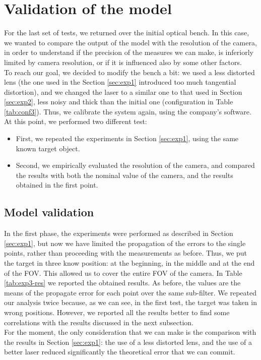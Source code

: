 \section{Validation of the model}
For the last set of tests, we returned over the initial optical bench. In this case, we wanted to compare the output of the model with the resolution of the camera, in order to understand if the precision of the measures we can make, is inferiorly limited by camera resolution, or if it is influenced also by some other factors. \\
To reach our goal, we decided to modify the bench a bit: we used a less distorted lens (the one used in the Section \ref{sec:exp1} introduced too much tangential distortion), and we changed the laser to a similar one to that used in Section \ref{sec:exp2}, less noisy and thick than the initial one (configuration in Table \ref{tab:conf3}). Thus, we calibrate the system again, using the company's software. At this point, we performed two different test:
 \begin{itemize}
   \item First, we repeated the experiments in Section \ref{sec:exp1}, using the same known target object.
   \item Second, we empirically evaluated the resolution of the camera, and compared the results with both the nominal value of the camera, and the results obtained in the first point.
 \end{itemize}
 

\subsection{Model validation}
In the first phase, the experiments were performed as described in Section \ref{sec:exp1}, but now we have limited the propagation of the errors to the single points, rather than proceeding with the measurements as before. Thus, we put the target in three know position: at the beginning, in the middle and at the end of the \acs{FOV}. This allowed us to cover the entire \acs{FOV} of the camera. In Table \ref{tab:exp3-res} we reported the obtained results. As before, the values are the means of the propagate error for each point over the same sub-filter. We repeated our analysis twice because, as we can see, in the first test, the target was taken in wrong positions. However, we reported all the results better to find some correlations with the results discussed in the next subsection. \\
  
For the moment, the only consideration that we can make is the comparison with the results in Section \ref{sec:exp1}: the use of a less distorted lens, and the use of a better laser reduced significantly the theoretical error that we can commit.

